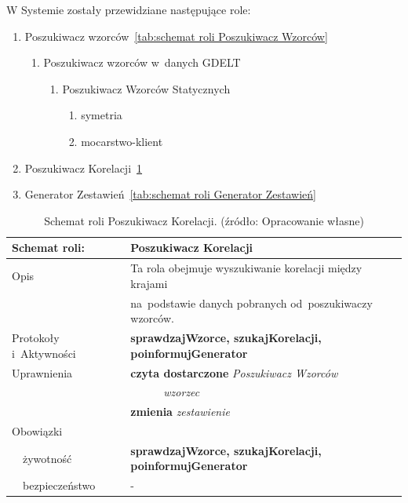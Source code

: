 \documentclass[11pt]{report}
\begin{document}
    W Systemie zostały przewidziane następujące role:

    \begin{enumerate}
        \item Poszukiwacz wzorców~\ref{tab:schemat roli Poszukiwacz Wzorców}
        \begin{enumerate}
            \item Poszukiwacz wzorców w~danych GDELT
            \begin{enumerate}
                \item Poszukiwacz Wzorców Statycznych
                \begin{enumerate}
                    \item symetria
                    \item mocarstwo-klient
                \end{enumerate}
            \end{enumerate}
        \end{enumerate}
        \item Poszukiwacz Korelacji~\ref{tab:schemat roli poszukiwacz korelacji}
        \item Generator Zestawień~\ref{tab:schemat roli Generator Zestawień}
    \end{enumerate}

    \begin{table}[ht!]
        \begin{tabular}{ll}
            Schemat roli:          & Poszukiwacz Korelacji                                           \\ \hline
            Opis                   & Ta rola obejmuje wyszukiwanie korelacji między krajami         \\
            & na~podstawie danych pobranych od~poszukiwaczy wzorców.         \\
            Protokoły i~Aktywności & \textbf{sprawdzajWzorce, szukajKorelacji, poinformujGenerator} \\
            Uprawnienia            & \textbf{czyta dostarczone} \textit{Poszukiwacz Wzorców}         \\
            & ~~~~~~\textit{wzorzec}                                         \\
            & \textbf{zmienia} \textit{zestawienie}                          \\
            Obowiązki              &                                                                \\
            ~~żywotność            & \textbf{sprawdzajWzorce, szukajKorelacji, poinformujGenerator} \\
            ~~bezpieczeństwo       & -                                                              \\
        \end{tabular}
        \caption{Schemat roli Poszukiwacz Korelacji. (źródło: Opracowanie własne)}
        \label{tab:schemat roli poszukiwacz korelacji}
    \end{table}
\end{document}
